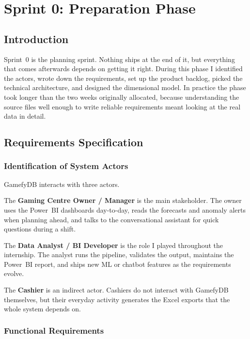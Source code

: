 \documentclass[12pt, a4paper]{report}
\begin{document}
\chapter{Sprint 0: Preparation Phase}

\section{Introduction}

Sprint~0 is the planning sprint. Nothing ships at the end of it, but everything
that comes afterwards depends on getting it right. During this phase I
identified the actors, wrote down the requirements, set up the product
backlog, picked the technical architecture, and designed the dimensional
model. In practice the phase took longer than the two weeks originally
allocated, because understanding the source files well enough to write
reliable requirements meant looking at the real data in detail.

\section{Requirements Specification}

\subsection{Identification of System Actors}

GamefyDB interacts with three actors.

The \textbf{Gaming Centre Owner / Manager} is the main stakeholder. The owner
uses the Power~BI dashboards day-to-day, reads the forecasts and anomaly
alerts when planning ahead, and talks to the conversational assistant for
quick questions during a shift.

The \textbf{Data Analyst / BI Developer} is the role I played throughout the
internship. The analyst runs the pipeline, validates the output, maintains the
Power~BI report, and ships new ML or chatbot features as the requirements
evolve.

The \textbf{Cashier} is an indirect actor. Cashiers do not interact with
GamefyDB themselves, but their everyday activity generates the Excel exports
that the whole system depends on.

\subsection{Functional Requirements}
\end{document}
